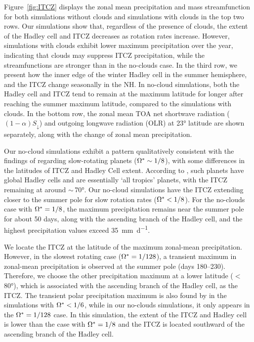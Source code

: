 Figure~\ref{fig:ITCZ} displays the zonal mean precipitation and mass streamfunction for both simulations without clouds and simulations with clouds in the top two rows. Our simulations show that, regardless of the presence of clouds, the extent of the Hadley cell and ITCZ decreases as rotation rates increase. However, simulations with clouds exhibit lower maximum precipitation over the year, indicating that clouds may suppress ITCZ precipitation, while the streamfunctions are stronger than in the no-clouds case. In the third row, we present how the inner edge of the winter Hadley cell in the summer hemisphere, and the ITCZ change seasonally in the NH. In no-cloud simulations, both the Hadley cell and ITCZ tend to remain at the maximum latitude for longer after reaching the summer maximum latitude, compared to the simulations with clouds. In the bottom row, the zonal mean TOA net shortwave radiation ($(1-\alpha)S_{\downarrow}$) and outgoing longwave radiation (OLR) at \ang{23} latitude are shown separately, along with the change of zonal mean precipitation.

Our no-cloud simulations exhibit a pattern qualitatively consistent with the findings of \citet{faulk2017-Effects} regarding slow-rotating planets ($\Omega^* \sim 1/8$), with some differences in the latitudes of ITCZ and Hadley Cell extent. According to \citet{faulk2017-Effects}, such planets have global Hadley cells and are essentially `all tropics' planets, with the ITCZ remaining at around $\sim\,$\ang{70}. Our no-cloud simulations have the ITCZ extending closer to the summer pole for slow rotation rates ($\Omega^*<1/8$). For the no-clouds case with $\Omega^*=1/8$, the maximum precipitation remains near the summer pole for about 50 days, along with the ascending branch of the Hadley cell, and the highest precipitation values exceed \SI{35}{\mm\per\day}.

We locate the ITCZ at the latitude of the maximum zonal-mean precipitation. However, in the slowest rotating case ($\Omega^*=1/128$), a transient maximum in zonal-mean precipitation is observed at the summer pole (days 180--230). Therefore, we choose the other precipitation maximum at a lower latitude ($<\,$\ang{80}), which is associated with the ascending branch of the Hadley cell, as the ITCZ. The transient polar precipitation maximum is also found by \citet{faulk2017-Effects} in the simulations with $\Omega^*<1/6$, while in our no-clouds simulations, it only appears in the $\Omega^*=1/128$ case. In this simulation, the extent of the ITCZ and Hadley cell is lower than the case with $\Omega^*=1/8$ and the ITCZ is located southward of the ascending branch of the Hadley cell.

